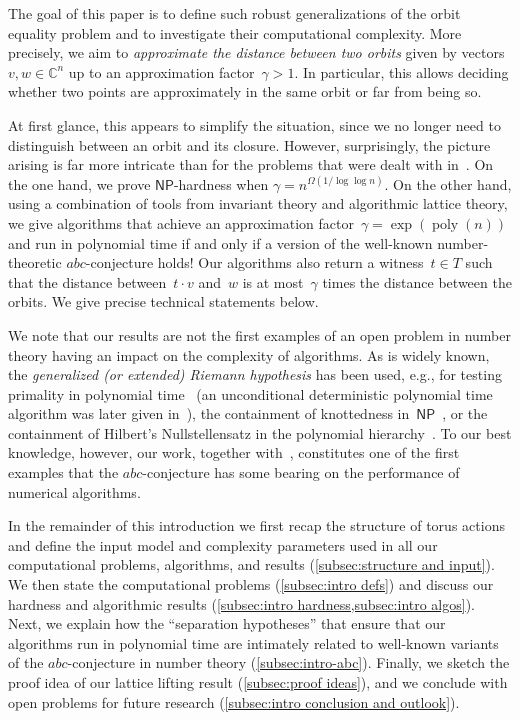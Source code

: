 \documentclass[10pt,a4paper]{article}
\theoremstyle{definition}
\DeclareMathOperator{\poly}{poly}
\newcommand{\CC}{\mathbb{C}}
\newcommand{\NP}{\ensuremath{\mathsf{NP}}\xspace}
\newcommand{\abc}{\texorpdfstring{$abc$}{abc}}
\numberwithin{equation}{section}
\begin{document}
The goal of this paper is to define such robust generalizations of the orbit equality problem and to investigate their computational complexity.
More precisely, we aim to \emph{approximate the distance between two orbits} given by vectors~$v,w \in \CC^n$
up to an approximation factor~$\gamma>1$.
In particular, this allows deciding whether two points are approximately in the same orbit or far from being so.

At first glance, this appears to simplify the situation, since we no longer need to distinguish between an orbit and its closure.
However, surprisingly, the picture arising is far more intricate than for the problems that were dealt with in~\cite{torus}.
On the one hand, we prove \NP-hardness when $\gamma = n^{\Omega(1/\!\log\log n)}$.
On the other hand, using a combination of tools from invariant theory and algorithmic lattice theory,
we give algorithms that achieve an approximation factor~$\gamma = \exp(\poly(n))$ and run in polynomial time
if and only if a version of the well-known number-theoretic \abc-conjecture holds!
Our algorithms also return a witness~$t \in T$ such that the distance between~$t \cdot v$ and~$w$ is at most~$\gamma$ times
the distance between the orbits.
We give precise technical statements below.

We note that our results are not the first examples of an open problem in number theory
having an impact on the complexity of algorithms.
As is widely known, the \textit{generalized (or extended) Riemann hypothesis} has been used, e.g.,
for testing primality in polynomial time~\cite{miller-primality}
(an unconditional deterministic polynomial time algorithm was later given in~\cite{aks-primality}),
the containment of knottedness in~\NP~\cite{kuperberg-knot},
or the containment of Hilbert's Nullstellensatz in the polynomial hierarchy~\cite{koiran-hn}.
To our best knowledge, however, our work, together with~\cite{mono-testing-abc},
constitutes one of the first examples that the \abc-conjecture has some bearing
on the performance of numerical algorithms.

In the remainder of this introduction we first recap the structure of torus actions and
define the input model and complexity parameters used in all our computational problems, algorithms,
and results (\cref{subsec:structure and input}).
We then state the computational problems (\cref{subsec:intro defs}) and discuss our
hardness and algorithmic results (\cref{subsec:intro hardness,subsec:intro algos}).
Next, we explain how the ``separation hypotheses'' that ensure that our algorithms run
in polynomial time are intimately related to well-known variants of
the $abc$-conjecture in number theory (\cref{subsec:intro-abc}).
Finally, we sketch the proof idea of our lattice lifting result (\cref{subsec:proof ideas}),
and we conclude with open problems for future research (\cref{subsec:intro conclusion and outlook}).
\end{document}
